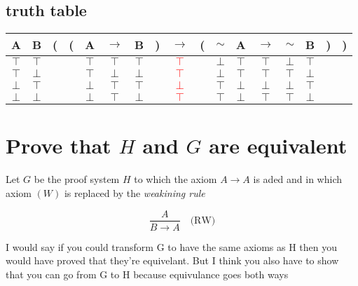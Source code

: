 \documentclass{article}
\begin{document}
\subsection{truth table}
\begin{tabular}{@{ }c@{ }@{ }c | c@{}@{}c@{}@{ }c@{ }@{ }c@{ }@{ }c@{ }@{}c@{}@{ }c@{ }@{}c@{}@{ }c@{ }@{ }c@{ }@{ }c@{ }@{ }c@{ }@{ }c@{ }@{}c@{}@{}c@{ }}
A & B & ( & ( & A & $\rightarrow$ & B & ) & $\rightarrow$ & ( & $\sim$ & A & $\rightarrow$ & $\sim$ & B & ) & )\\
\hline 
$\top$ & $\top$ &  &  & $\top$ & $\top$ & $\top$ &  & \textcolor{red}{$\top$} &  & $\bot$ & $\top$ & $\top$ & $\bot$ & $\top$ &  & \\
$\top$ & $\bot$ &  &  & $\top$ & $\bot$ & $\bot$ &  & \textcolor{red}{$\top$} &  & $\bot$ & $\top$ & $\top$ & $\top$ & $\bot$ &  & \\
$\bot$ & $\top$ &  &  & $\bot$ & $\top$ & $\top$ &  & \textcolor{red}{$\bot$} &  & $\top$ & $\bot$ & $\bot$ & $\bot$ & $\top$ &  & \\
$\bot$ & $\bot$ &  &  & $\bot$ & $\top$ & $\bot$ &  & \textcolor{red}{$\top$} &  & $\top$ & $\bot$ & $\top$ & $\top$ & $\bot$ &  & \\
\end{tabular}

\section{Prove that $H$ and $G$ are equivalent}
Let $G$ be the proof system $H$ to which the axiom $A \to A$ 
is aded and in which axiom $(W)$ is replaced by the \emph{weakining rule}

\[\frac{A}{B \to A}\quad\text{(RW)} \]

I would say if you could transform G to have the same
axioms as H then you would have proved that they're equivelant. But I think
you also have to show that you can go from G to H because equivulance goes both
ways
\end{document}
